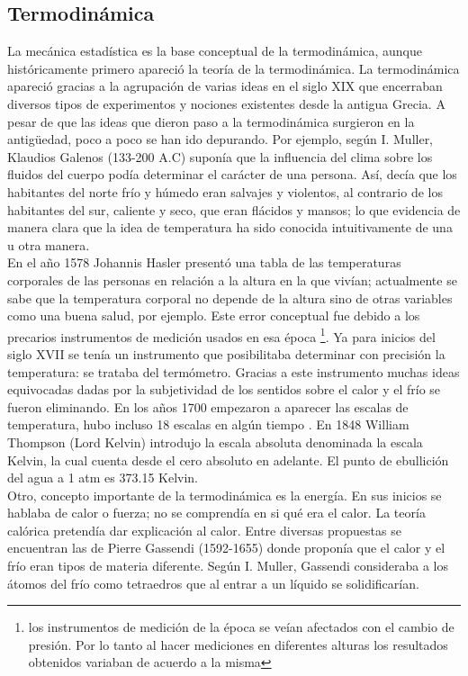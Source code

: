 \subsection{Termodinámica}
La mecánica estadística es la base conceptual de la termodinámica, aunque históricamente primero apareció la teoría de la termodinámica. La termodinámica apareció gracias a la agrupación de varias ideas en el siglo XIX que encerraban diversos tipos de experimentos y nociones existentes desde la antigua Grecia. A pesar de que las ideas que dieron paso a la termodinámica surgieron en la antigüedad, poco a poco se han ido depurando. Por ejemplo, según I. Muller, Klaudios Galenos (133-200 A.C) suponía que la influencia del clima sobre los fluidos del cuerpo podía determinar el carácter de una persona. Así, decía que los habitantes del norte frío y húmedo eran salvajes y violentos, al contrario de los habitantes del sur, caliente y seco, que eran flácidos y mansos; lo que evidencia de manera clara que la idea de temperatura ha sido conocida intuitivamente de una u otra manera. 
\\
En el año 1578 Johannis Hasler presentó una tabla de las temperaturas corporales de las personas en relación a la altura en la que vivían; actualmente se sabe que la temperatura corporal no depende de la altura sino de otras variables como una buena salud, por ejemplo. Este error conceptual fue debido a los precarios instrumentos de medición usados en esa época \footnote{los instrumentos de medición de la época se veían afectados con el cambio de presión. Por lo tanto al hacer mediciones en diferentes alturas los resultados obtenidos variaban de acuerdo a la misma}. Ya para inicios del siglo XVII se tenía un instrumento que posibilitaba determinar con precisión la temperatura: se trataba del termómetro. Gracias a este instrumento muchas ideas equivocadas dadas por la subjetividad de los sentidos sobre el calor y el frío se fueron eliminando. En los años 1700 empezaron a aparecer las escalas de temperatura, hubo incluso 18 escalas en algún tiempo \cite{MullerHistory}. En 1848 William Thompson (Lord Kelvin) introdujo la escala absoluta denominada la escala Kelvin, la cual cuenta desde el cero absoluto en adelante. El punto de ebullición del agua a 1 atm es 373.15 Kelvin.
\\
Otro, concepto importante de la termodinámica es la energía. En sus inicios se hablaba  de  calor o fuerza; no se comprendía en si qué era el calor. La teoría calórica pretendía dar explicación al calor. Entre diversas propuestas se encuentran las de Pierre Gassendi (1592-1655) donde proponía que el calor y el frío eran tipos de materia diferente. Según I. Muller, Gassendi consideraba a los átomos del frío como tetraedros que al entrar a un líquido se solidificarían.
